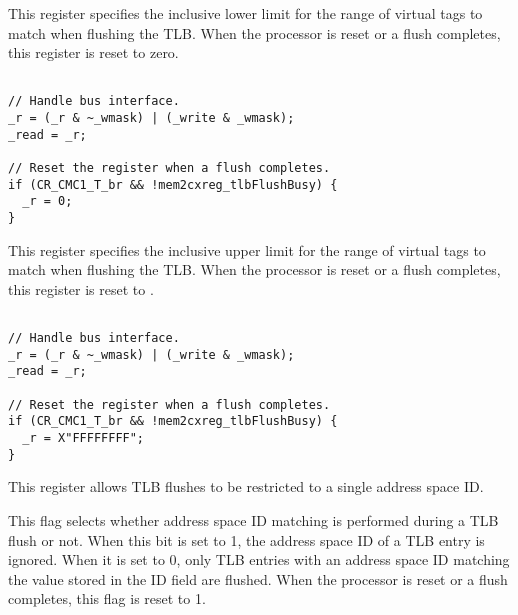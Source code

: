 This register specifies the inclusive lower limit for the range of virtual tags 
to match when flushing the TLB. When the processor is reset or a flush 
completes, this register is reset to zero.

\declaration{}
\implementation{}
\begin{lstlisting}

// Handle bus interface.
_r = (_r & ~_wmask) | (_write & _wmask);
_read = _r;

// Reset the register when a flush completes.
if (CR_CMC1_T_br && !mem2cxreg_tlbFlushBusy) {
  _r = 0;
}

\end{lstlisting}


This register specifies the inclusive upper limit for the range of virtual tags 
to match when flushing the TLB. When the processor is reset or a flush
completes, this register is reset to .

\declaration{}
\implementation{}
\begin{lstlisting}

// Handle bus interface.
_r = (_r & ~_wmask) | (_write & _wmask);
_read = _r;

// Reset the register when a flush completes.
if (CR_CMC1_T_br && !mem2cxreg_tlbFlushBusy) {
  _r = X"FFFFFFFF";
}

\end{lstlisting}


This register allows TLB flushes to be restricted to a single address space ID.

This flag selects whether address space ID matching is performed during a TLB 
flush or not. When this bit is set to 1, the address space ID of a TLB entry is 
ignored. When it is set to 0, only TLB entries with an address space ID matching 
the value stored in the ID field are flushed. When the processor is reset or a
flush completes, this flag is reset to 1.

